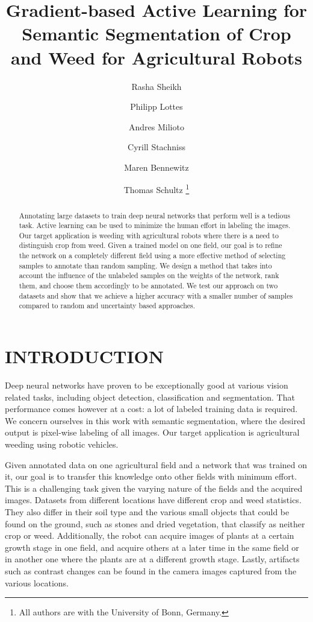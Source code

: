 \documentclass[letterpaper, 10 pt, conference]{ieeeconf}  %
\title{\LARGE \bf Gradient-based Active Learning for Semantic Segmentation of Crop and Weed for Agricultural Robots }
\author{Rasha Sheikh \and Philipp Lottes \and Andres Milioto \and Cyrill Stachniss \and Maren Bennewitz \and Thomas Schultz%
  \thanks{All authors are with the University of
    Bonn, Germany.}%
}
\begin{document}
\maketitle
\thispagestyle{empty} 
\pagestyle{empty}


\begin{abstract} 
Annotating large datasets to train deep neural networks that perform well is a tedious task. Active learning can be used to minimize the human effort in labeling the images. Our target application is weeding with agricultural robots where there is a need to distinguish crop from weed. Given a trained model on one field, our goal is to refine the network on a completely different field using a more effective method of selecting samples to annotate than random sampling. We design a method that takes into account the influence of the unlabeled samples on the weights of the network, rank them, and choose them accordingly to be annotated. We test our approach on two datasets and show that we achieve a higher accuracy with a smaller number of samples compared to random and uncertainty based approaches. 
\end{abstract} 

\section{INTRODUCTION}
\label{sec:intro}


Deep neural networks have proven to be exceptionally good at various vision related tasks, including object detection, classification and segmentation. That performance comes however at a cost: a lot of labeled training data is required.  We concern ourselves in this work with semantic segmentation, where the desired output is pixel-wise labeling of all images. Our target application is agricultural weeding using robotic vehicles. 

Given annotated data on one agricultural field and a network that was trained on it, our goal is to transfer this knowledge onto other fields with minimum effort. This is a challenging task given the varying nature of the fields and the acquired images. Datasets from different locations have different crop and weed statistics. They also differ in their soil type and the various small objects that could be found on the ground, such as stones and dried vegetation, that classify as neither crop or weed. Additionally, the robot can acquire images of plants at a certain growth stage in one field, and acquire others at a later time in the same field or in another one where the plants are at a different growth stage. Lastly, artifacts such as contrast changes can be found in the camera images captured from the various locations. 
\end{document}
